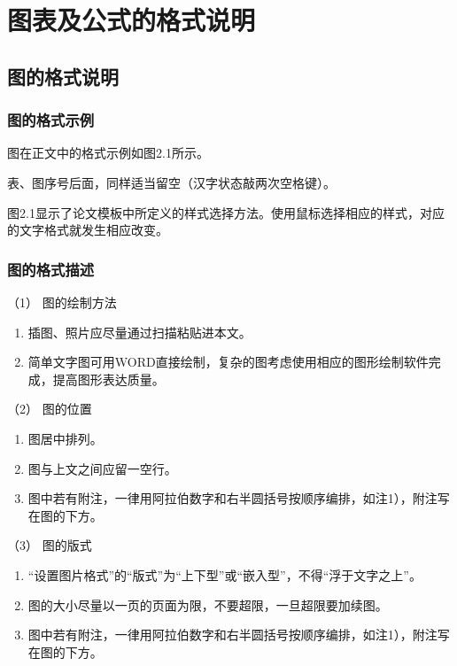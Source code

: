 
\chapter{图表及公式的格式说明}
\label{chap02}
\section{图的格式说明}
\subsection{图的格式示例}
图在正文中的格式示例如图2.1所示。

表、图序号后面，同样适当留空（汉字状态敲两次空格键）。

图2.1显示了论文模板中所定义的样式选择方法。使用鼠标选择相应的样式，对应的文字格式就发生相应改变。

\subsection{图的格式描述}
（1） 图的绘制方法
\begin{enumerate}[label=\circled{\arabic*}]
\item 插图、照片应尽量通过扫描粘贴进本文。
\item 简单文字图可用WORD直接绘制，复杂的图考虑使用相应的图形绘制软件完成，提高图形表达质量。
\end{enumerate}

（2） 图的位置
\begin{enumerate}[label=\circled{\arabic*}]
\item 图居中排列。
\item 图与上文之间应留一空行。
\item 图中若有附注，一律用阿拉伯数字和右半圆括号按顺序编排，如注1），附注写在图的下方。
\end{enumerate}

（3） 图的版式
\begin{enumerate}[label=\circled{\arabic*}]
\item “设置图片格式”的“版式”为“上下型”或“嵌入型”，不得“浮于文字之上”。
\item 图的大小尽量以一页的页面为限，不要超限，一旦超限要加续图。
\item 图中若有附注，一律用阿拉伯数字和右半圆括号按顺序编排，如注1），附注写在图的下方。
\end{enumerate}

